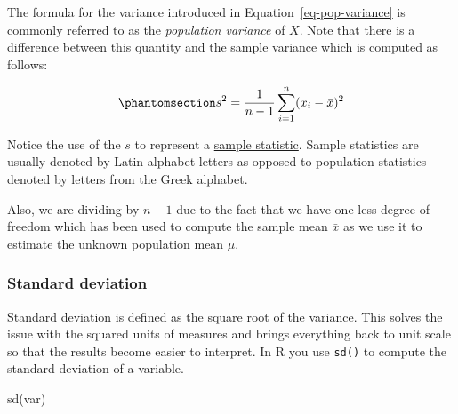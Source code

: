 \documentclass[
  letterpaper,
  DIV=11,
  numbers=noendperiod]{scrartcl}
\newenvironment{Shaded}{\begin{snugshade}}{\end{snugshade}}
\newcommand{\FunctionTok}[1]{\textcolor[rgb]{0.28,0.35,0.67}{#1}}
\newcommand{\NormalTok}[1]{\textcolor[rgb]{0.00,0.23,0.31}{#1}}
\begin{document}
\begin{tcolorbox}[enhanced jigsaw, colbacktitle=quarto-callout-note-color!10!white, bottomtitle=1mm, colframe=quarto-callout-note-color-frame, leftrule=.75mm, rightrule=.15mm, titlerule=0mm, opacityback=0, toptitle=1mm, bottomrule=.15mm, left=2mm, arc=.35mm, title=\textcolor{quarto-callout-note-color}{\faInfo}\hspace{0.5em}{Note}, toprule=.15mm, opacitybacktitle=0.6, colback=white, breakable, coltitle=black]

The formula for the variance introduced in
Equation~\ref{eq-pop-variance} is commonly referred to as the
\emph{population variance} of \(X\). Note that there is a difference
between this quantity and the sample variance which is computed as
follows:

\begin{equation}\phantomsection\label{eq-sample-var}{
s^2 = \frac{1}{n-1} \sum_{i=1}^n (x_i - \bar{x})^2
}\end{equation}

Notice the use of the \(s\) to represent a
\href{https://www.sciencedirect.com/topics/mathematics/sample-statistic}{sample
statistic}. Sample statistics are usually denoted by Latin alphabet
letters as opposed to population statistics denoted by letters from the
Greek alphabet.

Also, we are dividing by \(n-1\) due to the fact that we have one less
degree of freedom which has been used to compute the sample mean
\(\bar{x}\) as we use it to estimate the unknown population mean
\(\mu\).

\end{tcolorbox}

\subsubsection{Standard deviation}\label{standard-deviation}

Standard deviation is defined as the square root of the variance. This
solves the issue with the squared units of measures and brings
everything back to unit scale so that the results become easier to
interpret. In R you use \texttt{sd()} to compute the standard deviation
of a variable.

\begin{Shaded}
\begin{Highlighting}[]
\FunctionTok{sd}\NormalTok{(var)}
\end{Highlighting}
\end{Shaded}
\end{document}
